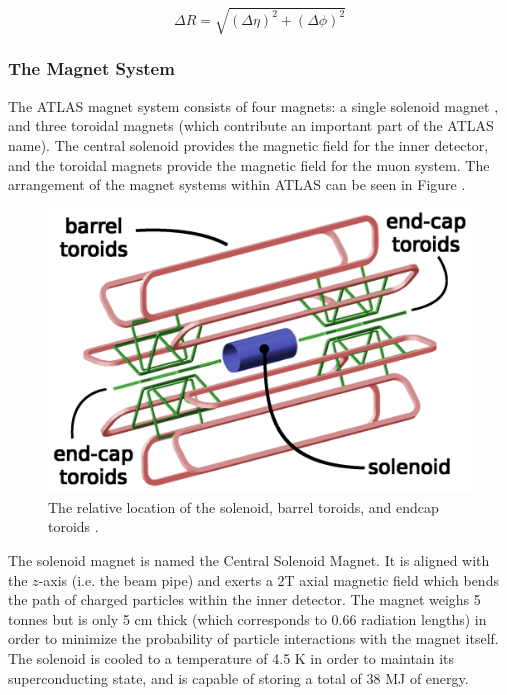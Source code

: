 \documentclass[12pt,a4paper,epsf,portrait,times,epsfig]{article}
\begin{document}
		\begin{equation}
			\Delta R = \sqrt{ (\Delta\eta)^{2} + (\Delta\phi)^{2} }
		\end{equation}


		\subsubsection{The Magnet System}

		The ATLAS magnet system consists of four magnets: a single solenoid magnet \cite{ATLASSolenoidMagnet}, and three toroidal magnets \cite{ATLASBarrelToroid, ATLASEndcapToroid} (which contribute an important part of the ATLAS name). The central solenoid provides the magnetic field for the inner detector, and the toroidal magnets provide the magnetic field	for the muon system. The arrangement of the magnet systems within ATLAS can be seen in Figure . \par

		\begin{figure}
			\centering
			\includegraphics[scale=0.15]{Magnet_Layout.png}
			\caption{The relative location of the solenoid, barrel toroids, and endcap toroids \cite{ATLASToroids}. }
			\label{Fig:CernMagneticLayout}
		\end{figure}

		The solenoid magnet is named the Central Solenoid Magnet. It is aligned with the $z$-axis (i.e. the beam pipe) and exerts a 2T axial magnetic field which bends the path of charged particles within the inner detector. The magnet weighs 5 tonnes but is only 5 cm thick (which corresponds to 0.66 radiation lengths) in order to minimize the probability of particle interactions with the magnet itself. The solenoid is cooled to a temperature of 4.5 K in order to maintain its superconducting state, and is capable of storing a total of 38 MJ of energy. \par
		
\end{document}
